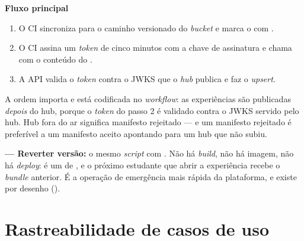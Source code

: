 \textbf{Fluxo principal}
\begin{enumerate}
  \item O CI sincroniza  para o caminho versionado do \emph{bucket} e
    marca o  com .
  \item O CI assina um \emph{token} de cinco minutos com a chave de assinatura e
    chama  com o conteúdo do
    .
  \item A API valida o \emph{token} contra o JWKS que o \emph{hub} publica e faz
    o \emph{upsert}.
\end{enumerate}

\begin{nota}
A ordem importa e está codificada no \emph{workflow}: as experiências são
publicadas \emph{depois} do hub, porque o \emph{token} do passo 2 é validado
contra o JWKS servido pelo hub. Hub fora do ar significa manifesto rejeitado ---
e um manifesto rejeitado é preferível a um manifesto aceito apontando para um hub
que não subiu.
\end{nota}

\textbf{ --- Reverter versão:} o mesmo \emph{script} com
. Não há \emph{build}, não há imagem, não há
\emph{deploy}: é um  de , e o próximo estudante que
abrir a experiência recebe o \emph{bundle} anterior. É a operação de emergência
mais rápida da plataforma, e existe por desenho ().

\section{Rastreabilidade de casos de uso}
\label{sec:uc-rastreio}

